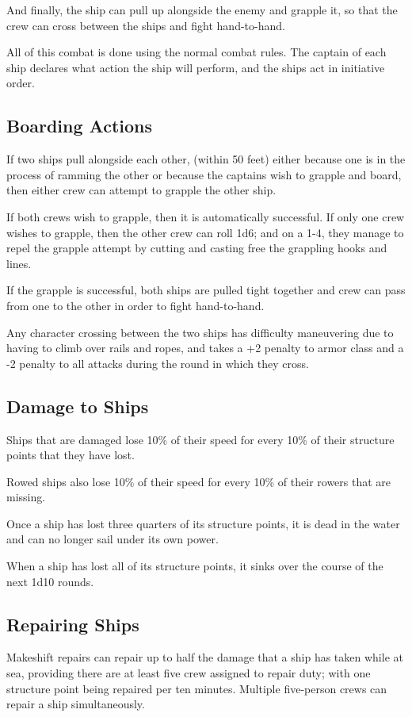 \begin{multicols*}{2}
And finally, the ship can pull up alongside the enemy and grapple it, so that the crew can cross between the ships and fight hand-to-hand.

All of this combat is done using the normal combat rules. The captain of each ship declares what action the ship will perform, and the ships act in initiative order.

\subsection{Boarding Actions}
If two ships pull alongside each other, (within 50 feet) either because one is in the process of ramming the other or because the captains wish to grapple and board, then either crew can attempt to grapple the other ship.

If both crews wish to grapple, then it is automatically successful. If only one crew wishes to grapple, then the other crew can roll 1d6; and on a 1-4, they manage to repel the grapple attempt by cutting and casting free the grappling hooks and lines.

If the grapple is successful, both ships are pulled tight together and crew can pass from one to the other in order to fight hand-to-hand.

Any character crossing between the two ships has difficulty maneuvering due to having to climb over rails and ropes, and takes a +2 penalty to armor class and a -2 penalty to all attacks during the round in which they cross.

\subsection{Damage to Ships}
Ships that are damaged lose 10\% of their speed for every 10\% of their structure points that they have lost.

Rowed ships also lose 10\% of their speed for every 10\% of their rowers that are missing.

Once a ship has lost three quarters of its structure points, it is dead in the water and can no longer sail under its own power.

When a ship has lost all of its structure points, it sinks over the course of the next 1d10 rounds.

\subsection{Repairing Ships}
Makeshift repairs can repair up to half the damage that a ship has taken while at sea, providing there are at least five crew assigned to repair duty; with one structure point being repaired per ten minutes. Multiple five-person crews can repair a ship simultaneously.


\end{multicols*}
